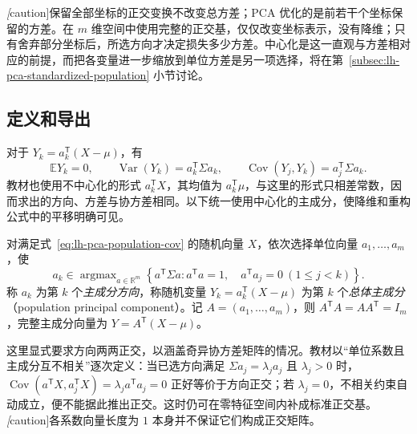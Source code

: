 \emph[caution]{保留全部坐标的正交变换不改变总方差；PCA 优化的是前若干个坐标保留的方差。}在 $m$ 维空间中使用完整的正交基，仅仅改变坐标表示，没有降维；只有舍弃部分坐标后，所选方向才决定损失多少方差。中心化是这一直观与方差相对应的前提，而把各变量进一步缩放到单位方差是另一项选择，将在第~\ref{subsec:lh-pca-standardized-population} 小节讨论。

\subsection{定义和导出}
\label{subsec:lh-pca-definition}

对于 $Y_k=a_k^{\mathsf T}(X-\mu)$，有
\begin{equation}
\mathbb E Y_k=0,\qquad
\operatorname{Var}(Y_k)=a_k^{\mathsf T}\Sigma a_k,\qquad
\operatorname{Cov}(Y_j,Y_k)=a_j^{\mathsf T}\Sigma a_k.
\label{eq:lh-pca-linear-cov}
\end{equation}
教材也使用不中心化的形式 $a_k^{\mathsf T}X$，其均值为 $a_k^{\mathsf T}\mu$，与这里的形式只相差常数，因而求出的方向、方差与协方差相同。以下统一使用中心化的主成分，使降维和重构公式中的平移明确可见。

\begin{definition}[总体主成分]
\label{def:lh-pca-population}
对满足式~\eqref{eq:lh-pca-population-cov} 的随机向量 $X$，依次选择单位向量 $a_1,\ldots,a_m$，使
\begin{equation}
a_k\in\mathop{\arg\max}_{a\in\mathbb R^m}
\left\{a^{\mathsf T}\Sigma a:
a^{\mathsf T}a=1,\quad a^{\mathsf T}a_j=0\ (1\leq j<k)\right\}.
\label{eq:lh-pca-sequential}
\end{equation}
称 $a_k$ 为第 $k$ 个\emph{主成分方向}，称随机变量 $Y_k=a_k^{\mathsf T}(X-\mu)$ 为第 $k$ 个\emph{总体主成分}（population principal component）。记 $A=(a_1,\ldots,a_m)$，则 $A^{\mathsf T}A=AA^{\mathsf T}=I_m$，完整主成分向量为 $Y=A^{\mathsf T}(X-\mu)$。
\end{definition}

这里显式要求方向两两正交，以涵盖奇异协方差矩阵的情况。教材以“单位系数且主成分互不相关”逐次定义：当已选方向满足 $\Sigma a_j=\lambda_j a_j$ 且 $\lambda_j>0$ 时，$\operatorname{Cov}(a^{\mathsf T}X,a_j^{\mathsf T}X)=\lambda_j a^{\mathsf T}a_j=0$ 正好等价于方向正交；若 $\lambda_j=0$，不相关约束自动成立，便不能据此推出正交。这时仍可在零特征空间内补成标准正交基。\emph[caution]{各系数向量长度为 $1$ 本身并不保证它们构成正交矩阵。}

